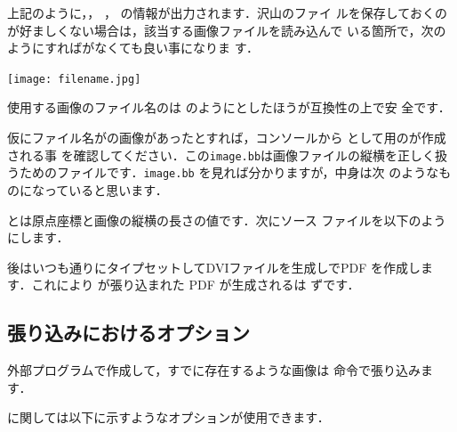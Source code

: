 上記のように，， ， の情報が出力されます．沢山のファイ
ルを保存しておくのが好ましくない場合は，該当する画像ファイルを読み込んで
いる箇所で，次のようにすればがなくても良い事になりま
す．

\begin{InText}
\texttt{[image: filename.jpg]}
\end{InText}

使用する画像のファイル名のは
のようにとしたほうが互換性の上で安
全です．


\begin{Exe}
仮にファイル名がの画像があったとすれば，コンソールから
として用のが作成される事
を確認してください．この\texttt{image.bb}は画像ファイルの縦横を正しく扱
うためのファイルです．\texttt{image.bb} を見れば分かりますが，中身は次
のようなものになっていると思います．

\begin{InText}
\end{InText}

とは原点座標と画像の縦横の長さの値です．次にソース
ファイルを以下のようにします．


後はいつも通りにタイプセットしてDVIファイルを生成し\prog{\Dvipdfmx}でPDF
を作成します．これにより が張り込まれた PDF が生成されるは
ずです．
\end{Exe}

\subsection{張り込みにおけるオプション}

外部プログラムで作成して，すでに存在するような画像は 
命令で張り込みます．
\begin{Syntax}
\end{Syntax}

に関しては以下に示すようなオプションが使用できます．

